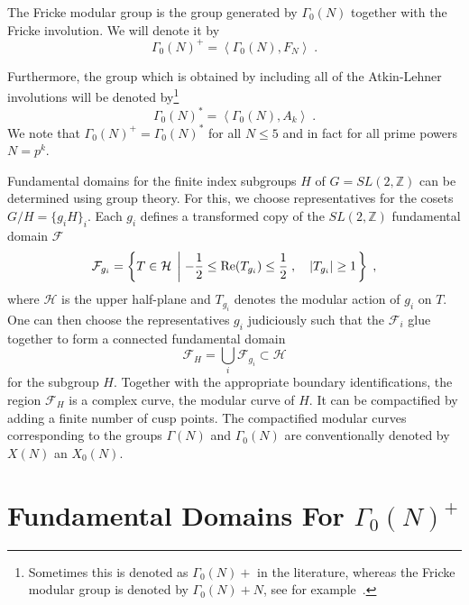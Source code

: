 \documentclass[11pt,a4paper]{article}
\numberwithin{equation}{section}
\numberwithin{table}{section}\setlength{\multlinegap}{25pt}
\begin{document}
The Fricke modular group is the group generated by $\Gamma_0(N)$ together with the Fricke involution. We will denote it by
\begin{equation}
    \Gamma_0(N)^+=\left<\Gamma_0(N),F_N\right>\;.
\end{equation}

Furthermore, the group which is obtained by including all of the Atkin-Lehner involutions will be denoted by\footnote{Sometimes this is denoted as $\Gamma_0(N)+$ in the literature, whereas the Fricke modular group is denoted by $\Gamma_0(N)+N$, see for example~\cite{Conway:1979qga,Lian:1995js}.}
\begin{equation}
    \Gamma_0(N)^*=\left<\Gamma_0(N),A_k\right>\;.
\end{equation}
We note that $\Gamma_0(N)^+=\Gamma_0(N)^*$ for all $N\leq 5$ and in fact for all prime powers $N=p^k$.

Fundamental domains for the finite index subgroups $H$ of $G=SL(2,\mathbb{Z})$ can be determined using group theory. For this, we choose representatives for the cosets $G/H=\{g_iH\}_i$. Each $g_i$ defines a transformed copy of the $SL(2,\mathbb{Z})$ fundamental domain $\mathcal{F}$
\begin{equation}
    \mathcal{F}_{g_i}=\left\{ T\in\mathcal{H} \;\left|\;-\frac12\leq\textup{Re}(T_{g_i})\leq\frac12\;,\quad |T_{g_i}|\geq1\right.\right\}\;,
\end{equation}
where $\mathcal{H}$ is the upper half-plane and $T_{g_i}$ denotes the modular action of $g_i$ on $T$. One can then choose the representatives $g_i$ judiciously such that the $\mathcal{F}_i$ glue together to form a connected fundamental domain
\begin{equation}
\label{eq:fundomain_cosets}
    \mathcal{F}_H=\bigcup_i \mathcal{F}_{g_i}\subset\mathcal{H}
\end{equation}
for the subgroup $H$. Together with the appropriate boundary identifications, the region $\mathcal{F}_H$ is a complex curve, the modular curve of $H$. It can be compactified by adding a finite number of cusp points. The compactified modular curves corresponding to the groups $\Gamma(N)$ and $\Gamma_0(N)$ are conventionally denoted by $X(N)$ an $X_0(N)$.

\section{Fundamental Domains For \texorpdfstring{$\Gamma_0(N)^+$}{Gamma0+(N)}}
\label{app:FunDomains}
\end{document}
